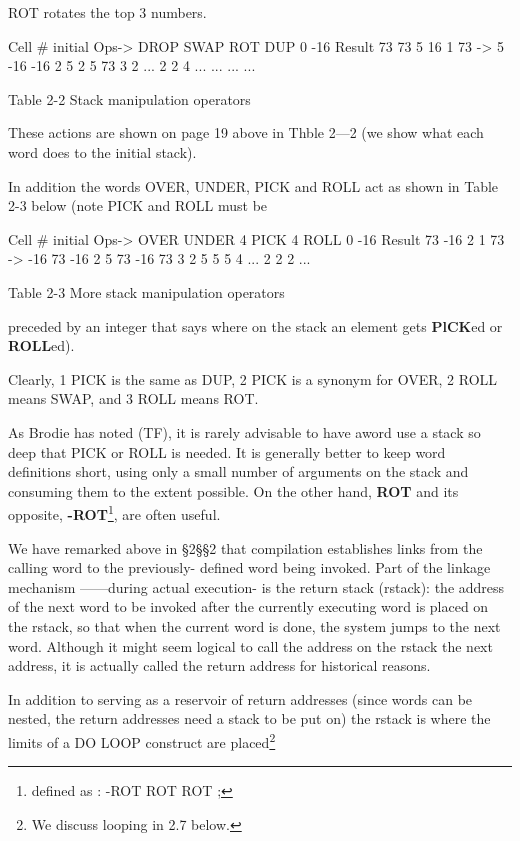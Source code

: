 ROT rotates the top 3 numbers.

Cell \# 	initial 	Ops->	DROP 	SWAP	ROT		DUP
0		-16		Result	73		73		5		16
1		73		->		5		-16		-16
2		5				2		5		73
3		2				...		2		2
4		...				...		...		...

Table 2-2 Stack manipulation operators

These actions are shown on page 19 above in Thble 2—2 (we show what each word does to the initial stack).

In addition the words OVER, UNDER, PICK and ROLL act as shown in Table 2-3 below (note PICK and ROLL must be

Cell \# 	initial		Ops->	OVER	UNDER	4 PICK	4 ROLL
0 		-16		 Result 	73 		-16		2
1 		73 		-> 		-16		73		-16
2 		5 				73 		-16		73
3 		2				5 		5		5
4 		...				2		2		2		...

Table 2-3 More stack manipulation operators

preceded by an integer that says where on the stack an element gets  \textbf{PlCK}ed or  \textbf{ROLL}ed).

Clearly, 1 PICK is the same as DUP, 2 PICK is a synonym for OVER, 2 ROLL means SWAP, and 3 ROLL means ROT.

As Brodie has noted (TF), it is rarely advisable to have aword use a stack so deep that PICK or ROLL is needed. It is generally better to keep word deﬁnitions short, using only a small number of arguments on the stack and consuming them to the extent possible. On the other hand, \textbf{ROT} and its opposite, \textbf{-ROT}\footnote{deﬁned as : -ROT ROT ROT ;}, are often useful.


We have remarked above in §2§§2 that compilation establishes links from the calling word to the previously- deﬁned word being invoked. Part of the linkage mechanism ——during actual execution- is the return stack (rstack): the address of the next word to be invoked after the currently executing word is placed on the rstack, so that when the current word is done, the system jumps to the next word. Although it might seem logical to call the address on the rstack the next address, it is actually called the return address for historical reasons.

In addition to serving as a reservoir of return addresses (since words can be nested, the return addresses need a stack to be put on) the rstack is where the limits of a DO LOOP construct are placed\footnote{We discuss looping in 2.7 below.}

